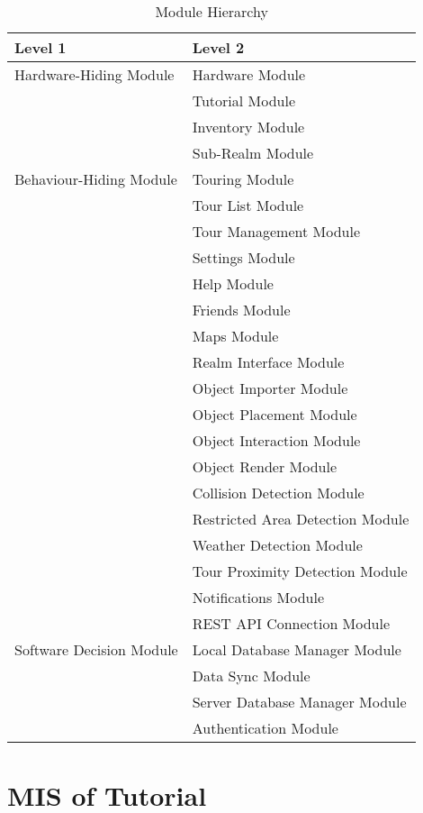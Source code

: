 \documentclass[12pt, titlepage]{article}
\begin{document}
\begin{table}[h!]
  \centering
  \begin{tabular}{p{} p{}}
    \toprule
    \textbf{Level 1}                               & \textbf{Level 2}                \\
    \midrule

{Hardware-Hiding Module} & Hardware Module\\
\midrule

\multirow{7}{0.3\textwidth}{Behaviour-Hiding Module} & Tutorial Module\\
& Inventory Module\\
& Sub-Realm Module\\
& Touring Module\\
& Tour List Module\\
& Tour Management Module\\
& Settings Module\\
& Help Module\\
& Friends Module\\
& Maps Module\\
& Realm Interface Module\\
& Object Importer Module\\
& Object Placement Module\\
& Object Interaction Module\\
& Object Render Module\\
& Collision Detection Module\\
& Restricted Area Detection Module\\
& Weather Detection Module\\
& Tour Proximity Detection Module\\
& Notifications Module\\
\midrule

\multirow{3}{0.3\textwidth}{Software Decision Module} & REST API Connection Module\\
& Local Database Manager Module\\
& Data Sync Module\\
& Server Database Manager Module\\
& Authentication Module\\
\bottomrule

\end{tabular}
\caption{Module Hierarchy}
\label{TblMH}
\end{table}

\newpage

\section{MIS of Tutorial} \label{Tutorial}
\end{document}

